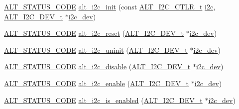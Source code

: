 \begin{DoxyCompactItemize}
\item 
\mbox{\hyperlink{hwlib_8h_abdb0d369f069723ca55d6c94bcaaaa12}{A\+L\+T\+\_\+\+S\+T\+A\+T\+U\+S\+\_\+\+C\+O\+DE}} \mbox{\hyperlink{group__ALT__I2C_ga6c4e543ed4ae5b99e8e2ff02eae463cc}{alt\+\_\+i2c\+\_\+init}} (const \mbox{\hyperlink{group__ALT__I2C_ga1db51a8ca7c78d287a620a1f894ba1c5}{A\+L\+T\+\_\+\+I2\+C\+\_\+\+C\+T\+L\+R\+\_\+t}} \mbox{\hyperlink{structi2c}{i2c}}, \mbox{\hyperlink{structALT__I2C__DEV__s}{A\+L\+T\+\_\+\+I2\+C\+\_\+\+D\+E\+V\+\_\+t}} $\ast$\mbox{\hyperlink{structi2c__dev}{i2c\+\_\+dev}})
\item 
\mbox{\hyperlink{hwlib_8h_abdb0d369f069723ca55d6c94bcaaaa12}{A\+L\+T\+\_\+\+S\+T\+A\+T\+U\+S\+\_\+\+C\+O\+DE}} \mbox{\hyperlink{group__ALT__I2C_gaeabf95833cc757c3ff6315c13194777d}{alt\+\_\+i2c\+\_\+reset}} (\mbox{\hyperlink{structALT__I2C__DEV__s}{A\+L\+T\+\_\+\+I2\+C\+\_\+\+D\+E\+V\+\_\+t}} $\ast$\mbox{\hyperlink{structi2c__dev}{i2c\+\_\+dev}})
\item 
\mbox{\hyperlink{hwlib_8h_abdb0d369f069723ca55d6c94bcaaaa12}{A\+L\+T\+\_\+\+S\+T\+A\+T\+U\+S\+\_\+\+C\+O\+DE}} \mbox{\hyperlink{group__ALT__I2C_gae7cc51922c0e90eb3695c4757fb7eba3}{alt\+\_\+i2c\+\_\+uninit}} (\mbox{\hyperlink{structALT__I2C__DEV__s}{A\+L\+T\+\_\+\+I2\+C\+\_\+\+D\+E\+V\+\_\+t}} $\ast$\mbox{\hyperlink{structi2c__dev}{i2c\+\_\+dev}})
\item 
\mbox{\hyperlink{hwlib_8h_abdb0d369f069723ca55d6c94bcaaaa12}{A\+L\+T\+\_\+\+S\+T\+A\+T\+U\+S\+\_\+\+C\+O\+DE}} \mbox{\hyperlink{group__ALT__I2C_gad16c19c9abacbfbe6f4501b0db490322}{alt\+\_\+i2c\+\_\+disable}} (\mbox{\hyperlink{structALT__I2C__DEV__s}{A\+L\+T\+\_\+\+I2\+C\+\_\+\+D\+E\+V\+\_\+t}} $\ast$\mbox{\hyperlink{structi2c__dev}{i2c\+\_\+dev}})
\item 
\mbox{\hyperlink{hwlib_8h_abdb0d369f069723ca55d6c94bcaaaa12}{A\+L\+T\+\_\+\+S\+T\+A\+T\+U\+S\+\_\+\+C\+O\+DE}} \mbox{\hyperlink{group__ALT__I2C_ga60c931e6e918b963313fc729c5418289}{alt\+\_\+i2c\+\_\+enable}} (\mbox{\hyperlink{structALT__I2C__DEV__s}{A\+L\+T\+\_\+\+I2\+C\+\_\+\+D\+E\+V\+\_\+t}} $\ast$\mbox{\hyperlink{structi2c__dev}{i2c\+\_\+dev}})
\item 
\mbox{\hyperlink{hwlib_8h_abdb0d369f069723ca55d6c94bcaaaa12}{A\+L\+T\+\_\+\+S\+T\+A\+T\+U\+S\+\_\+\+C\+O\+DE}} \mbox{\hyperlink{group__ALT__I2C_ga766698352e55a0abdf158be06c7faed1}{alt\+\_\+i2c\+\_\+is\+\_\+enabled}} (\mbox{\hyperlink{structALT__I2C__DEV__s}{A\+L\+T\+\_\+\+I2\+C\+\_\+\+D\+E\+V\+\_\+t}} $\ast$\mbox{\hyperlink{structi2c__dev}{i2c\+\_\+dev}})

\end{DoxyCompactItemize}
